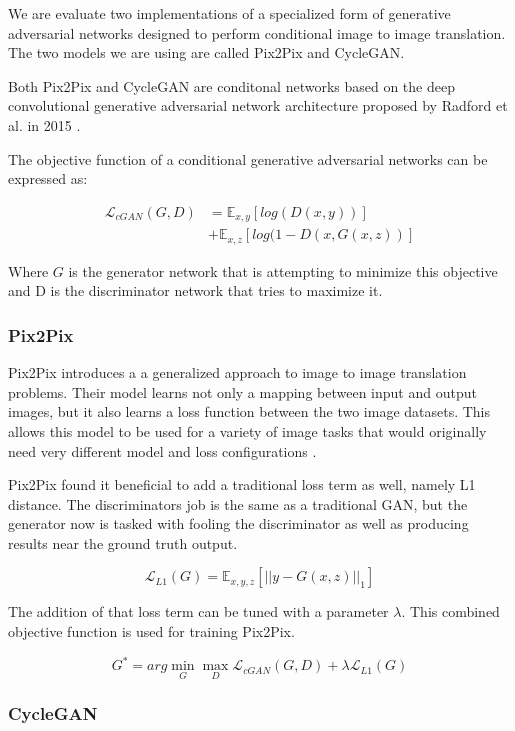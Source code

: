 \documentclass[twocolumn]{article}
\begin{document}
	We are evaluate two implementations of a specialized form of generative adversarial networks designed to perform conditional image to image translation. The two models we are using are called Pix2Pix and CycleGAN.
	
	Both Pix2Pix and CycleGAN are conditonal networks based on the deep convolutional generative adversarial network architecture proposed by Radford et al. in 2015 \cite{radford2015unsupervised}.
	
	The objective function of a conditional generative adversarial networks can be expressed as:
	
	\begin{align*}
		\mathcal{L}_{cGAN}(G, D) &= \mathbb{E}_{x,y}[log(D(x, y))] \\
		&+ \mathbb{E}_{x,z}[log(1 - D(x, G(x, z))]
	\end{align*}
	
	Where $G$ is the generator network that is attempting to minimize this objective and D is the discriminator network that tries to maximize it.
	
	\subsubsection{Pix2Pix}	
	
	Pix2Pix introduces a a generalized approach to image to image translation problems.  Their model learns not only a mapping between input and output images, but it also learns a loss function between the two image datasets. This allows this model to be used for a variety of image tasks that would originally need very different model and loss configurations \cite{isola2016imagetoimage}.
	
	Pix2Pix found it beneficial to add a traditional loss term as well, namely L1 distance. The discriminators job is the same as a traditional GAN, but the generator now is tasked with fooling the discriminator as well as producing results near the ground truth output.
	
	$$
		\mathcal{L}_{L1}(G) = \mathbb{E}_{x,y,z}[|| y - G(x, z) ||_1]		
	$$

	The addition of that loss term can be tuned with a parameter  $\lambda$. This combined objective function is used for training Pix2Pix.
	
	$$	
		G^* = arg \mathop{min}_G \mathop{max}_D \mathcal{L}_{cGAN}(G, D) + \lambda \mathcal{L}_{L1}(G)
	$$
	
	\subsubsection{CycleGAN}
	
\end{document}
